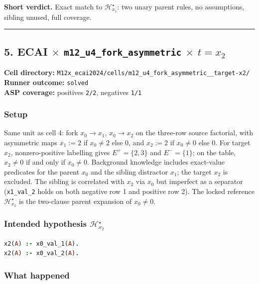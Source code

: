 \documentclass[11pt]{article}
\begin{document}
\textbf{Short verdict.} Exact match to \(\mathcal{H}_{x_1}^\star\): two unary parent rules, no assumptions, sibling unused, full coverage.

\medskip\hrule\medskip

\subsection{\texorpdfstring{5. ECAI \(\times\) \texttt{m12\_u4\_fork\_asymmetric} \(\times\) \(t=x_2\)}{5. ECAI - m12-u4-fork-asymmetric - target x2}}

\textbf{Cell directory:} \texttt{M12x\_ecai2024/cells/m12\_u4\_fork\_asymmetric\_\_target-x2/}\\
\textbf{Runner outcome:} \texttt{solved}\\
\textbf{ASP coverage:} positives \texttt{2/2}, negatives \texttt{1/1}

\subsubsection{Setup}

Same unit as cell 4: fork \(x_0\to x_1\), \(x_0\to x_2\) on the three-row source factorial, with asymmetric maps \(x_1:=2\) if \(x_0\neq 2\) else \(0\), and \(x_2:=2\) if \(x_0\neq 0\) else \(0\). For target \(x_2\), nonzero-positive labelling gives \(E^+=\{2,3\}\) and \(E^-=\{1\}\); on the table, \(x_2\neq 0\) if and only if \(x_0\neq 0\). Background knowledge includes exact-value predicates for the parent \(x_0\) and the sibling distractor \(x_1\); the target \(x_2\) is excluded. The sibling is correlated with \(x_2\) via \(x_0\) but imperfect as a separator (\texttt{x1\_val\_2} holds on both negative row 1 and positive row 2). The locked reference \(\mathcal{H}_{x_2}^\star\) is the two-clause parent expansion of \(x_0\neq 0\).

\subsubsection{\texorpdfstring{Intended hypothesis \(\mathcal{H}_{x_2}^\star\)}{Intended hypothesis H-star(x2)}}

\begin{lstlisting}[style=logic,language=Prolog]
x2(A) :- x0_val_1(A).
x2(A) :- x0_val_2(A).
\end{lstlisting}

\subsubsection{What happened}
\end{document}
